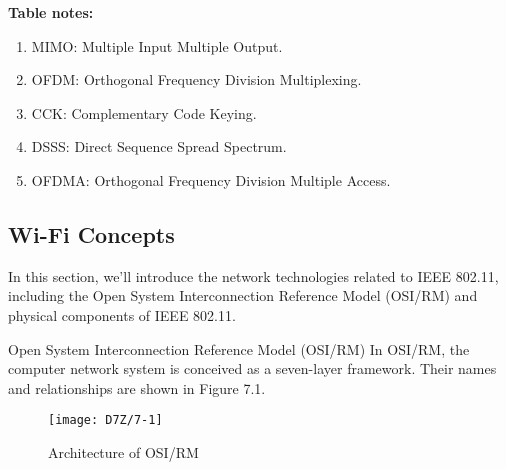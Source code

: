 \documentclass[a4paper,12pt]{book}
\begin{document}
\textbf{Table notes:}

\begin{enumerate}[label=$^\arabic*$]
    \item MIMO: Multiple Input Multiple Output.
    \item OFDM: Orthogonal Frequency Division Multiplexing.
    \item CCK: Complementary Code Keying.
    \item DSSS: Direct Sequence Spread Spectrum.
    \item OFDMA: Orthogonal Frequency Division Multiple Access.
\end{enumerate}

\subsection{Wi-Fi Concepts}
In this section, we’ll introduce the network technologies related to IEEE 802.11, including the Open System Interconnection Reference Model (OSI/RM) and physical components of IEEE 802.11.

\begin{term}{Open System Interconnection Reference Model (OSI/RM)}
    In OSI/RM, the computer network system is conceived as a seven-layer framework. Their names and relationships are shown in Figure 7.1.

    \begin{figure}[!h]
        \centering
        \texttt{[image: D7Z/7-1]}
        \caption{Architecture of OSI/RM}
    \end{figure}
\end{term}
\end{document}
